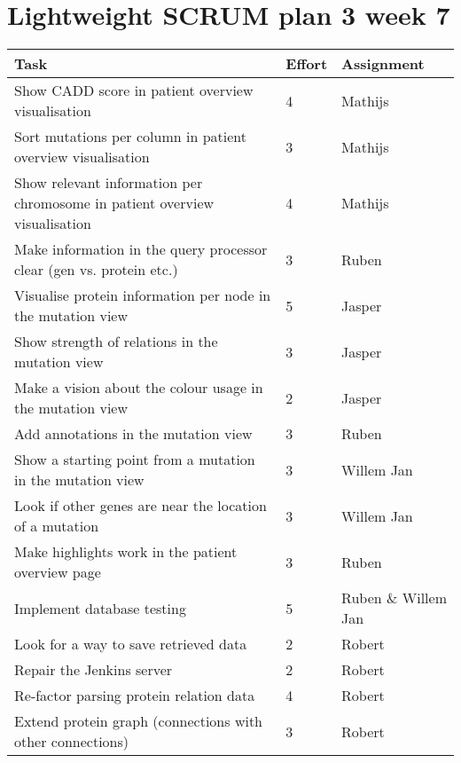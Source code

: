 \documentclass[a4paper]{report}
\begin{document}


\section*{Lightweight SCRUM plan 3 week 7}

\setlength\extrarowheight{5pt}
\begin{table}[ht]
\begin{tabular}{p{8cm}|p{2cm}|p{3cm}}

\textbf{Task} & \textbf{Effort} & \textbf{Assignment}\\
\hline \hline

Show CADD score in patient overview visualisation & 4 & Mathijs \\
Sort mutations per column in patient overview visualisation & 3 & Mathijs \\
Show relevant information per chromosome in patient overview visualisation & 4 & Mathijs \\
Make information in the query processor clear (gen vs. protein etc.) & 3 & Ruben \\
Visualise protein information per node in the mutation view & 5 & Jasper \\
Show strength of relations in the mutation view & 3 & Jasper \\
Make a vision about the colour usage in the mutation view & 2 & Jasper \\
Add annotations in the mutation view & 3 & Ruben \\
Show a starting point from a mutation in the mutation view & 3 & Willem Jan \\
Look if other genes are near the location of a mutation & 3 & Willem Jan \\
Make highlights work in the patient overview page & 3 & Ruben \\
Implement database testing & 5 & Ruben \& Willem Jan \\
Look for a way to save retrieved data & 2 & Robert \\
Repair the Jenkins server & 2 & Robert \\
Re-factor parsing protein relation data & 4 & Robert \\
Extend protein graph (connections with other connections) & 3 & Robert
\end{tabular}
\end{table}
\end{document}
